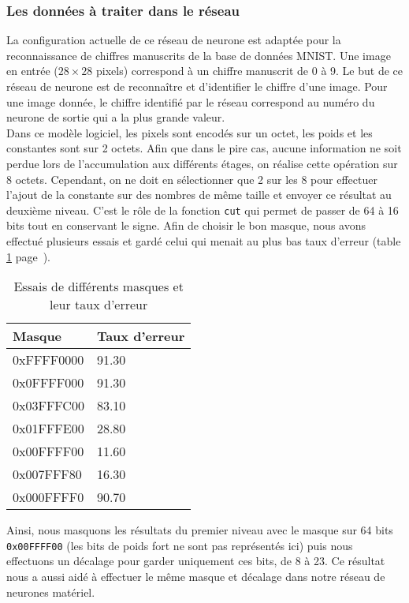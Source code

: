 \subsubsection{Les données à traiter dans le réseau}

La configuration actuelle de ce réseau de neurone est adaptée pour la
reconnaissance de chiffres manuscrits de la base de données MNIST. Une image
en entrée ($28 \times 28$ pixels) correspond à un chiffre manuscrit de 0 à 9.
Le but de ce réseau de neurone est de reconnaître et d'identifier le chiffre
d'une image. Pour une image donnée, le chiffre identifié par le réseau correspond
au numéro du neurone de sortie qui a la plus grande valeur. \\
Dans ce modèle logiciel, les pixels sont encodés sur un octet, les poids et les
constantes sont sur 2 octets. Afin que dans le pire cas, aucune information ne
soit perdue lors de l'accumulation aux différents étages, on réalise cette opération sur
8 octets. Cependant, on ne doit en sélectionner que 2 sur les 8 pour effectuer l'ajout de la constante
sur des nombres de même taille et envoyer ce résultat au deuxième niveau. C'est
le rôle de la fonction \texttt{cut} qui permet de passer de 64 à 16 bits tout
en conservant le signe. Afin de choisir le bon masque, nous avons effectué
plusieurs essais et gardé celui qui menait au plus bas taux d'erreur (table
\ref{masques} page~\pageref{masques}).

\begin{table}[h!]
\centering
    \begin{tabular}{| l | l |}
    \hline
    Masque & Taux d'erreur \\ \hline
    0xFFFF0000 & 91.30 \\ \hline
    0x0FFFF000 & 91.30 \\ \hline
    0x03FFFC00 & 83.10 \\ \hline
    0x01FFFE00 & 28.80 \\ \hline
    0x00FFFF00 & 11.60 \\ \hline
    0x007FFF80 & 16.30 \\ \hline
    0x000FFFF0 & 90.70 \\ \hline
    \end{tabular}
    \caption{Essais de différents masques et leur taux d'erreur}
    \label{masques}
\end{table}

Ainsi, nous masquons les résultats du premier niveau avec le masque sur 64 bits
\texttt{0x00FFFF00} (les bits de poids fort ne sont pas représentés ici) puis
nous effectuons un décalage pour garder uniquement ces bits, de 8 à 23. Ce
résultat nous a aussi aidé à effectuer le même masque et décalage dans notre
réseau de neurones matériel.

